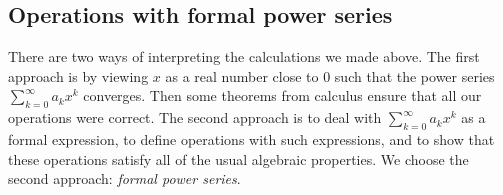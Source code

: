 

\setcounter{section}{2}
\setcounter{subsection}{2}
\setcounter{dfn}{0}

\subsection{Operations with formal power series}
\label{sec:OperFPS}
There are two ways of interpreting the calculations we made above.
The first approach is by viewing $x$ as a real number close to $0$ such that the power series $\sum_{k=0}^\infty a_k x^k$ converges.
Then some theorems from calculus ensure that all our operations were correct.
The second approach is to deal with $\sum_{k=0}^\infty a_k x^k$ as a formal expression,
to define operations with such expressions, and to show that these operations satisfy all of the usual algebraic properties.
We choose the second approach: \emph{formal power series}.


